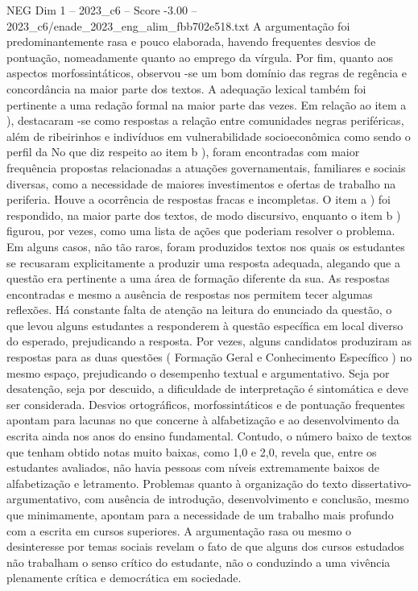 \begin{textsample}{NEG Dim 1 – 2023\_c6 – Score -3.00 – 2023\_c6/enade\_2023\_eng\_alim\_fbb702e518.txt}
A argumentação foi predominantemente rasa e pouco elaborada, havendo frequentes desvios de pontuação, nomeadamente quanto ao emprego da vírgula.
Por fim, quanto aos aspectos morfossintáticos, observou -se um bom domínio das regras de regência e concordância na maior parte dos textos.
A adequação lexical também foi pertinente a uma redação formal na maior parte das vezes.
Em relação ao item a ), destacaram -se como respostas a relação entre comunidades negras periféricas, além de ribeirinhos e indivíduos em vulnerabilidade socioeconômica como sendo o perfil da No que diz respeito ao item b ), foram encontradas com maior frequência propostas relacionadas a atuações governamentais, familiares e sociais diversas, como a necessidade de maiores investimentos e ofertas de trabalho na periferia.
Houve a ocorrência de respostas fracas e incompletas.
O item a ) foi respondido, na maior parte dos textos, de modo discursivo, enquanto o item b ) figurou, por vezes, como uma lista de ações que poderiam resolver o problema.
Em alguns casos, não tão raros, foram produzidos textos nos quais os estudantes se recusaram explicitamente a produzir uma resposta adequada, alegando que a questão era pertinente a uma área de formação diferente da sua.
As respostas encontradas e mesmo a ausência de respostas nos permitem tecer algumas reflexões.
Há constante falta de atenção na leitura do enunciado da questão, o que levou alguns estudantes a responderem à questão específica em local diverso do esperado, prejudicando a resposta.
Por vezes, alguns candidatos produziram as respostas para as duas questões ( Formação Geral e Conhecimento Específico ) no mesmo espaço, prejudicando o desempenho textual e argumentativo.
Seja por desatenção, seja por descuido, a dificuldade de interpretação é sintomática e deve ser considerada.
Desvios ortográficos, morfossintáticos e de pontuação frequentes apontam para lacunas no que concerne à alfabetização e ao desenvolvimento da escrita ainda nos anos do ensino fundamental.
Contudo, o número baixo de textos que tenham obtido notas muito baixas, como 1,0 e 2,0, revela que, entre os estudantes avaliados, não havia pessoas com níveis extremamente baixos de alfabetização e letramento.
Problemas quanto à organização do texto dissertativo-argumentativo, com ausência de introdução, desenvolvimento e conclusão, mesmo que minimamente, apontam para a necessidade de um trabalho mais profundo com a escrita em cursos superiores.
A argumentação rasa ou mesmo o desinteresse por temas sociais revelam o fato de que alguns dos cursos estudados não trabalham o senso crítico do estudante, não o conduzindo a uma vivência plenamente crítica e democrática em sociedade.

\end{textsample}
